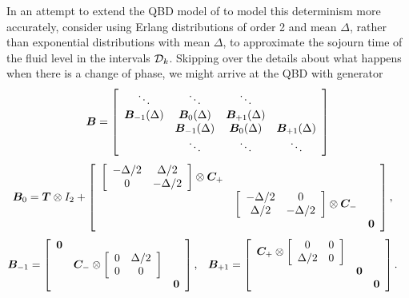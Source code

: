 In an attempt to extend the QBD model of \cite{bo2013} to model this determinism more accurately, consider using Erlang distributions of order 2 and mean \(\Delta\), rather than exponential distributions with mean \(\Delta\), to approximate the sojourn time of the fluid level in the intervals \(\mathcal{D}_k\). Skipping over the details about what happens when there is a change of phase, we might arrive at the QBD with generator 
\[\boldsymbol B = \left[ \begin{array}{cccc} \ddots & \ddots & \ddots & \\ \boldsymbol B_{-1}(\Delta) & \boldsymbol B_0(\Delta) & \boldsymbol B_{+1}(\Delta) & \\  & \boldsymbol B_{-1}(\Delta) & \boldsymbol B_0(\Delta) & \boldsymbol B_{+1}(\Delta) \\ & \ddots & \ddots & \ddots \end{array} \right]\]
\begin{align}
\boldsymbol B_0 &= \boldsymbol T\otimes I_2 + \left[ \begin{array}{ccc} \left[\begin{array}{cc} -\Delta/2 & \Delta/2 \\ 0 & -\Delta/2 \end{array}\right] \otimes \boldsymbol C_+ & & \\ & \left[\begin{array}{cc} -\Delta/2 & 0 \\ \Delta/2 & -\Delta/2 \end{array}\right] \otimes \boldsymbol C_- & \\ & & \boldsymbol 0 \end{array}\right], 
\end{align}
\begin{align}
\boldsymbol B_{-1} &= \left[\begin{array}{ccc} \boldsymbol 0 & & \\ & \boldsymbol C_-\otimes \left[\begin{array}{cc} 0 & \Delta/2 \\ 0 & 0 \end{array}\right] & \\ & & \boldsymbol 0 \end{array}\right],
&&\boldsymbol B_{+1} = \left[\begin{array}{ccc} \boldsymbol C_+\otimes \left[\begin{array}{cc} 0 & 0 \\ \Delta/2 & 0 \end{array}\right] & & \\ & \boldsymbol 0 & \\ & & \boldsymbol 0\end{array}\right].
\end{align}
